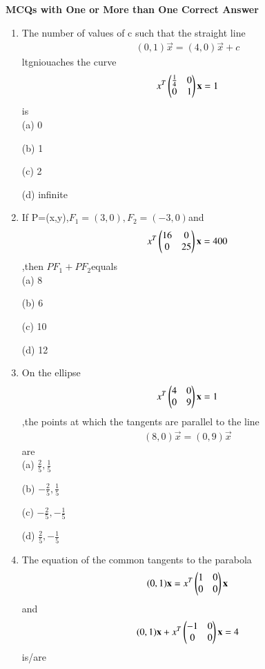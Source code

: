 \documentclass[journal,12pt,twocolumn]{IEEEtran}
\begin{document}
{\Large\textbf{MCQs with One or More than One Correct Answer }}
\begin{enumerate}

\item The number of values of c such that the straight line \begin{align}(0,1)\vec x=(4,0)\vec x+c\end{align}ltgniouaches the curve \begin{align}x^T\begin{pmatrix}\frac{1}{4}& 0 \\0 & 1\end{pmatrix} \mathbf x=1\end{align}is \\
    
    \choice (a) 0
    
    \choice (b) 1
    
    \choice (c) 2
    
    \choice (d) infinite\\
    
    \item If P=(x,y),$F_1=(3,0),F_2=(-3,0)$and \begin{align}x^T\begin{pmatrix}16& 0 \\0 & 25\end{pmatrix}\mathbf x=400\end{align},then $PF_1+PF_2$equals \\
    
    \choice (a) 8
     
    \choice (b) 6
    
    \choice (c) 10
    
    \choice (d) 12\\
    
    \item On the ellipse \begin{align} x^T\begin{pmatrix}4& 0 \\0 & 9\end{pmatrix} \mathbf x=1\end{align},the points at which the tangents are parallel to the line \begin{align}(8,0)\vec x=(0,9)\vec x\end{align} are \\
    
     \choice (a) $\frac{2}{5},\frac{1}{5}$
     
     \choice (b) $-\frac{2}{5},\frac{1}{5}$
     
     \choice (c) $-\frac{2}{5},-\frac{1}{5}$
     
     \choice (d) $\frac{2}{5},-\frac{1}{5}$\\
     
     \item The equation of the common tangents to the parabola \begin{align}(0,1)\mathbf x= x^T\begin{pmatrix}1& 0 \\0 & 0\end{pmatrix}\mathbf x\end{align} and \begin{align}(0,1)\mathbf x+x^T\begin{pmatrix}
    -1& 0 \\0 & 0 \end{pmatrix}\mathbf x=4\end{align} is/are \\
    

\end{enumerate}
\end{document}
